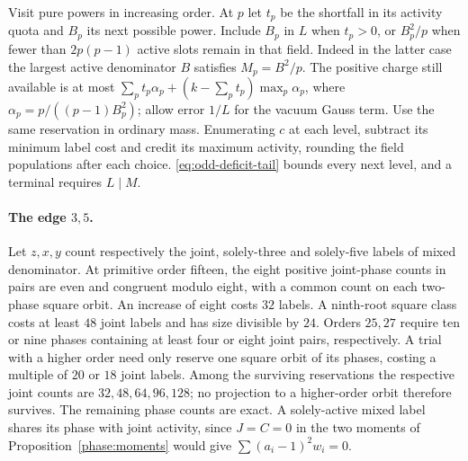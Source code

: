 \documentclass[11pt]{amsart}
\numberwithin{equation}{section}
\theoremstyle{definition}
\theoremstyle{plain}
\begin{document}
Visit pure powers in increasing order. At $p$ let $t_p$ be the shortfall
in its activity quota and $B_p$ its next possible power. Include $B_p$
in $L$ when $t_p>0$, or $B_p^2/p$ when fewer than $2p(p-1)$ active
slots remain in that field. Indeed in the latter case the largest
active denominator $B$ satisfies $M_p=B^2/p$. The positive charge
still available is at most
$\sum_p t_p\alpha_p+(k-\sum_p t_p)\max_p\alpha_p$, where
$\alpha_p=p/((p-1)B_p^2)$; allow error $1/L$ for the vacuum Gauss term.
Use the same reservation in ordinary mass. Enumerating $c$ at each
level, subtract its minimum label cost and credit its maximum activity,
rounding the field populations after each choice. \eqref{eq:odd-deficit-tail}
bounds every next level, and a terminal requires $L\mid M$.

\paragraph{The edge $3,5$.}
Let $z,x,y$ count respectively the joint, solely-three and solely-five
labels of mixed denominator. At primitive order fifteen, the eight
positive joint-phase counts in pairs are even and congruent modulo
eight, with a common count on each two-phase square orbit. An increase
of eight costs $32$ labels. A ninth-root square class costs at least
$48$ joint labels and has size divisible by $24$. Orders $25,27$ require
ten or nine phases containing at least four or eight joint pairs,
respectively. A trial with a higher order need only reserve one square orbit of
its phases, costing a multiple of $20$ or $18$ joint labels. Among the
surviving reservations the respective joint counts are $32,48,64,96,128$;
no projection to a higher-order orbit therefore survives. The remaining phase counts are exact. A solely-active mixed label shares its phase with
joint activity, since $J=C=0$ in the two moments of Proposition~\ref{phase:moments} would give
$\sum(a_i-1)^2w_i=0$.
\end{document}
